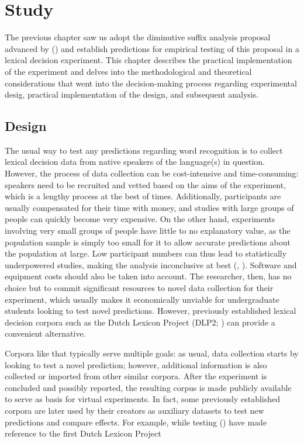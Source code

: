 \chapter{Study}\label{chp:study}
The previous chapter saw us adopt the diminutive suffix analysis proposal advanced by \citeauthor{DeBelder+etal+2014} (\citeyear{DeBelder+etal+2014}) and establish predictions for empirical testing of this proposal in a lexical decision experiment. This chapter describes the practical implementation of the experiment and delves into the methodological and theoretical considerations that went into the decision-making process regarding experimental desig, practical implementation of the design, and subsequent analysis.

\section{Design}
The usual way to test any predictions regarding word recognition is to collect lexical decision data from native speakers of the language(s) in question. However, the process of data collection can be cost-intensive and time-consuming: speakers need to be recruited and vetted based on the aims of the experiment, which is a lengthy process at the best of times. Additionally, participants are usually compensated for their time with money, and studies with large groups of people can quickly become very expensive. On the other hand, experiments involving very small groups of people have little to no explanatory value, as the population sample is simply too small for it to allow accurate predictions about the population at large. Low participant numbers can thus lead to statistically underpowered studies, making the analysis inconclusive at best (\citeauthor{Winter+2019}, \citeyear{Winter+2019}). Software and equipment costs should also be taken into account. The researcher, then, has no choice but to commit significant resources to novel data collection for their experiment, which usually makes it economically unviable for undergraduate students looking to test novel predictions. However, previously established lexical decision corpora such as the Dutch Lexicon Project (DLP2; \cite{Brysbaert+etal+2016}) can provide a convenient alternative.

Corpora like that typically serve multiple goals: as usual, data collection starts by looking to test a novel prediction; however, additional information is also collected or imported from other similar corpora. After the experiment is concluded and possibly reported, the resulting corpus is made publicly available to serve as basis for virtual experiments. In fact, some previously established corpora are later used by their creators as auxiliary datasets to test new predictions and compare effects. For example, while testing \citeauthor{Brysbaert+etal+2016} (\citeyear{Brysbaert+etal+2016}) have made reference to the first Dutch Lexicon Project

